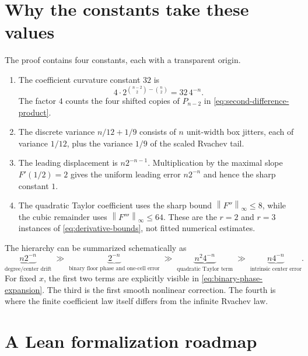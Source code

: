 \documentclass[11pt,oneside]{article}
\theoremstyle{definition}
\theoremstyle{remark}
\newcommand{\norm}[1]{\left\lVert #1\right\rVert}
\begin{document}
\section{Why the constants take these values}
\label{sec:constants}

The proof contains four constants, each with a transparent origin.

\begin{enumerate}
\item The coefficient curvature constant $32$ is
\begin{equation*}
 4\cdot 2^{\binom{n-2}{2}-\binom n2}=32\,4^{-n}.
\end{equation*}
The factor $4$ counts the four shifted copies of $P_{n-2}$ in
\eqref{eq:second-difference-product}.

\item The discrete variance $n/12+1/9$ consists of $n$ unit-width box jitters,
each of variance $1/12$, plus the variance $1/9$ of the scaled Rvachev tail.

\item The leading displacement is $n2^{-n-1}$.  Multiplication by the maximal
slope $F'(1/2)=2$ gives the uniform leading error $n2^{-n}$ and hence the sharp
constant $1$.

\item The quadratic Taylor coefficient uses the sharp bound
$\norm{F''}_\infty\le8$, while the cubic remainder uses
$\norm{F'''}_\infty\le64$.  These are the $r=2$ and $r=3$ instances of
\eqref{eq:derivative-bounds}, not fitted numerical estimates.
\end{enumerate}

The hierarchy can be summarized schematically as
\begin{equation}
 \underbrace{n2^{-n}}_{\text{degree/center drift}}
 \;\gg\;
 \underbrace{2^{-n}}_{\text{binary floor phase and one-cell error}}
 \;\gg\;
 \underbrace{n^2 4^{-n}}_{\text{quadratic Taylor term}}
 \;\gg\;
 \underbrace{n4^{-n}}_{\text{intrinsic center error}}.     \label{eq:hierarchy}
\end{equation}
For fixed $x$, the first two terms are explicitly visible in
\eqref{eq:binary-phase-expansion}.  The third is the first smooth nonlinear
correction.  The fourth is where the finite coefficient law itself differs from
the infinite Rvachev law.

\section{A Lean formalization roadmap}
\label{sec:lean-roadmap}
\end{document}
